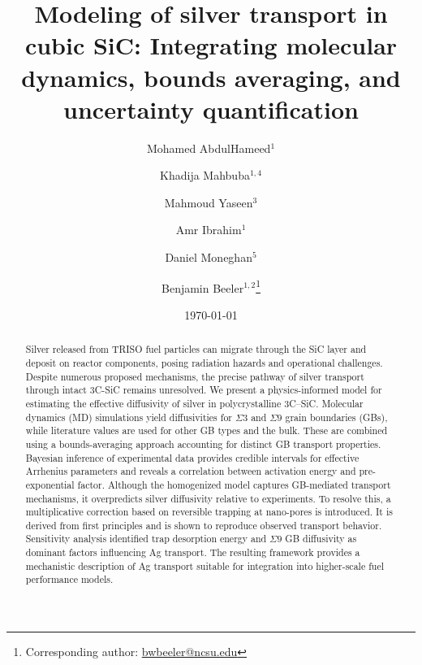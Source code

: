 \documentclass[%
preprint,
amsmath,amssymb,
aps,
]{revtex4-2}
\newcommand{\?}{\stackrel{?}{=}}
\begin{document}

\title{Modeling of silver transport in cubic SiC: Integrating molecular dynamics, bounds averaging, and uncertainty quantification}

\author{Mohamed AbdulHameed$^{1}$}
\author{Khadija Mahbuba$^{1,4}$}
\author{Mahmoud Yaseen$^{3}$}
\author{Amr Ibrahim$^{1}$}
\author{Daniel Moneghan$^{5}$}
\author{Benjamin Beeler$^{1,2}$\thanks{Corresponding author: \href{mailto:bwbeeler@ncsu.edu}{bwbeeler@ncsu.edu}}}


\date{\today}

\begin{abstract}
Silver released from TRISO fuel particles can migrate through the SiC layer and deposit on reactor components, posing radiation hazards and operational challenges. Despite numerous proposed mechanisms, the precise pathway of silver transport through intact 3C-SiC remains unresolved. We present a physics-informed model for estimating the effective diffusivity of silver in polycrystalline 3C–SiC. Molecular dynamics (MD) simulations yield diffusivities for $\Sigma 3$ and $\Sigma 9$ grain boundaries (GBs), while literature values are used for other GB types and the bulk. These are combined using a bounds-averaging approach accounting for distinct GB transport properties. Bayesian inference of experimental data provides credible intervals for effective Arrhenius parameters and reveals a correlation between activation energy and pre-exponential factor. Although the homogenized model captures GB-mediated transport mechanisms, it overpredicts silver diffusivity relative to experiments. To resolve this, a multiplicative correction based on reversible trapping at nano-pores is introduced. It is derived from first principles and is shown to reproduce observed transport behavior. Sensitivity analysis identified trap desorption energy and $\Sigma 9$ GB diffusivity as dominant factors influencing Ag transport. The resulting framework provides a mechanistic description of Ag transport suitable for integration into higher-scale fuel performance models. 


\end{abstract}
\end{document}
